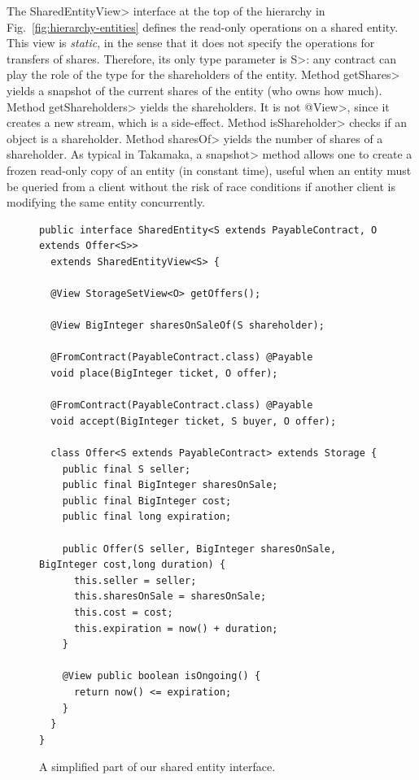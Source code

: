 The \<SharedEntityView> interface at the top of the hierarchy in Fig.~\ref{fig:hierarchy-entities}
defines the read-only operations on a shared entity. This view is \emph{static}, in the sense that it
does not specify the operations for transfers of shares. Therefore, its only type parameter is \<S>:
any contract can play the role of the type for the shareholders of the entity.
Method \<getShares> yields a snapshot of the
current shares of the entity (who owns how much). Method \<getShareholders> yields the shareholders.
It is not \<@View>, since it creates a new stream, which is a side-effect.
Method \<isShareholder> checks if an object is a shareholder. Method \<sharesOf> yields
the number of shares of a shareholder. As typical in Takamaka, a \<snapshot> method allows one
to create a frozen read-only copy of an entity (in constant time), useful when an entity must be queried from
a client without the risk of race conditions if another client is modifying the same entity concurrently.


\begin{figure}[ht]
  \begin{center}
    \begin{lstlisting}[language=Takamaka]
public interface SharedEntity<S extends PayableContract, O extends Offer<S>>
  extends SharedEntityView<S> {

  @View StorageSetView<O> getOffers();

  @View BigInteger sharesOnSaleOf(S shareholder);

  @FromContract(PayableContract.class) @Payable
  void place(BigInteger ticket, O offer);

  @FromContract(PayableContract.class) @Payable
  void accept(BigInteger ticket, S buyer, O offer);

  class Offer<S extends PayableContract> extends Storage {
    public final S seller;
    public final BigInteger sharesOnSale;
    public final BigInteger cost;
    public final long expiration;

    public Offer(S seller, BigInteger sharesOnSale, BigInteger cost,long duration) {
      this.seller = seller;
      this.sharesOnSale = sharesOnSale;
      this.cost = cost;
      this.expiration = now() + duration;
    }

    @View public boolean isOngoing() {
      return now() <= expiration;
    }
  }
}
    \end{lstlisting}
  \end{center}
  \caption{A simplified part of our shared entity interface.}\label{fig:shared_entity}
\end{figure}

